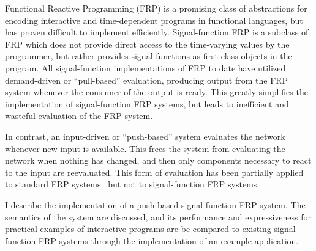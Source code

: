 Functional Reactive Programming (FRP) is a promising class of abstractions for encoding interactive and time-dependent programs in
functional languages, but has proven difficult to implement efficiently. Signal-function FRP is a subclass of FRP which does not provide
direct access to the time-varying  values by the programmer, but rather provides signal functions as first-class objects in the
program. All signal-function implementations of FRP to date have utilized demand-driven or ``pull-based''  evaluation, producing output from
the FRP system whenever the consumer of the output is ready. This greatly simplifies the implementation of signal-function FRP systems, but
leads to inefficient and wasteful evaluation of the FRP system.

In contrast, an input-driven or ``push-based'' system evaluates the network whenever new input is available. This frees the system from
evaluating the network when nothing has changed, and then only components necessary to react to the input are reevaluated.
This form of evaluation has been partially applied to standard FRP systems~\cite{Elliott2009} but not to signal-function FRP systems.

I describe the implementation of a push-based signal-function FRP system. The semantics of the system are discussed, and its performance
and expressiveness for practical examples of interactive programs are be compared to existing signal-function FRP systems through the
implementation of an example application.

